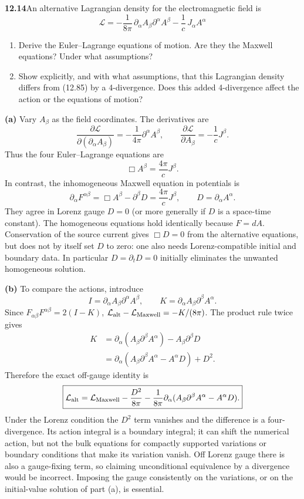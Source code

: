 \par\bigskip
\noindent\textbf{12.14}\quad An alternative Lagrangian density for the electromagnetic field is
\[
\mathcal{L}=-\frac{1}{8\pi}\,\partial_{\alpha}A_{\beta}\partial^{\alpha}A^{\beta}-\frac{1}{c}\,J_{\alpha}A^{\alpha}
\]
\begin{enumerate}
\item[(a)] Derive the Euler--Lagrange equations of motion. Are they the Maxwell equations? Under what assumptions?
\item[(b)] Show explicitly, and with what assumptions, that this Lagrangian density differs from (12.85) by a 4-divergence. Does this added 4-divergence affect the action or the equations of motion?
\end{enumerate}
\solution

\medskip\noindent\textbf{(a)} Vary $A_\beta$ as the field coordinates.  The derivatives are
\[
\frac{\partial\mathcal L}{\partial(\partial_\alpha A_\beta)}
=-\frac1{4\pi}\partial^\alpha A^\beta,
\qquad
\frac{\partial\mathcal L}{\partial A_\beta}=-\frac1cJ^\beta.
\]
Thus the four Euler--Lagrange equations are
\[
\boxed{\Box A^\beta=\frac{4\pi}{c}J^\beta.}
\]
In contrast, the inhomogeneous Maxwell equation in potentials is
\[
\partial_\alpha F^{\alpha\beta}
=\Box A^\beta-\partial^\beta D=\frac{4\pi}{c}J^\beta,
\qquad D=\partial_\alpha A^\alpha.
\]
They agree in Lorenz gauge $D=0$ (or more generally if $D$ is a
space-time constant).  The homogeneous equations hold identically
because $F=dA$.  Conservation of the source current gives
$\Box D=0$ from the alternative equations, but does not by itself
set $D$ to zero: one also needs Lorenz-compatible initial and boundary
data.  In particular $D=\partial_tD=0$ initially eliminates the
unwanted homogeneous solution.

\medskip\noindent\textbf{(b)} To compare the actions, introduce
\[
I=\partial_\alpha A_\beta\partial^\alpha A^\beta,\qquad
K=\partial_\alpha A_\beta\partial^\beta A^\alpha.
\]
Since $F_{\alpha\beta}F^{\alpha\beta}=2(I-K)$,
$\mathcal L_{\rm alt}-\mathcal L_{\rm Maxwell}=-K/(8\pi)$.
The product rule twice gives
\begin{align*}
K&=\partial_\alpha(A_\beta\partial^\beta A^\alpha)
-A_\beta\partial^\beta D\\
&=\partial_\alpha(A_\beta\partial^\beta A^\alpha-A^\alpha D)+D^2.
\end{align*}
Therefore the exact off-gauge identity is
\[
\boxed{\mathcal L_{\rm alt}=\mathcal L_{\rm Maxwell}
-\frac{D^2}{8\pi}
-\frac1{8\pi}\partial_\alpha
 (A_\beta\partial^\beta A^\alpha-A^\alpha D).}
\]
Under the Lorenz condition the $D^2$ term vanishes and the difference
is a four-divergence.  Its action integral is a boundary integral;
it can shift the numerical action, but not the bulk equations for
compactly supported variations or boundary conditions that make its
variation vanish.  Off Lorenz gauge there is also a gauge-fixing
term, so claiming unconditional equivalence by a divergence would
be incorrect.  Imposing the gauge consistently on the variations,
or on the initial-value solution of part (a), is essential.

